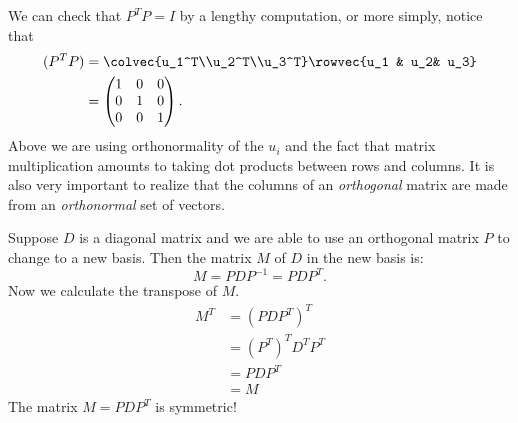 \begin{example}
We can check that $P^TP=I$ by a lengthy computation, or more simply, notice that
\begin{align*}
(P^TP)%
&= \colvec{u_1^T\\u_2^T\\u_3^T} \rowvec{u_1 & u_2& u_3} \\
&= \begin{pmatrix}1&0&0\\0&1&0\\0&0&1\end{pmatrix}.
\end{align*}
Above we are using orthonormality of the $u_i$ and the fact that matrix multiplication amounts to taking dot products between rows and columns.
It is also very \hypertarget{basisorthog}{important to realize that the columns of an {\itshape orthogonal} matrix are made
from an {\itshape orthonormal} set of vectors}.
\end{example}

\begin{remark}
Suppose $D$ is a diagonal matrix  and we are able to use an orthogonal matrix $P$ to change to a new basis.  Then the matrix $M$ of $D$ in the new basis is:
\[
M = PDP^{-1} = PDP^T.
\]
Now we calculate the transpose of $M$.
\begin{align*}
M^T
&= (PDP^T)^T\\
&= (P^T)^TD^TP^T \\
&= PDP^T\\
&= M
\end{align*}
The matrix $M=PDP^T$ is symmetric!
\end{remark}



